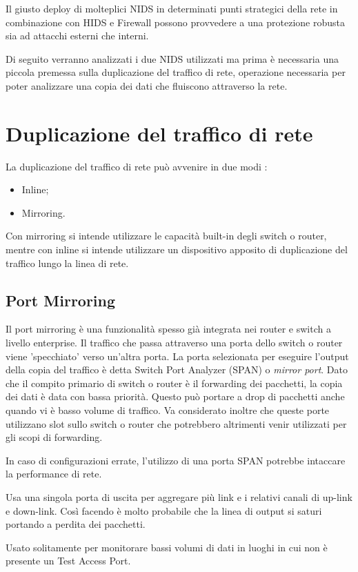 Il giusto deploy di molteplici NIDS in determinati punti strategici della rete in combinazione con HIDS e Firewall possono provvedere a una  protezione robusta sia ad attacchi esterni che interni.

Di seguito verranno analizzati i due NIDS utilizzati ma prima è necessaria una piccola premessa sulla duplicazione del traffico di rete, operazione necessaria per poter analizzare una copia dei dati che fluiscono attraverso la rete.
\section{Duplicazione del traffico di rete}
La duplicazione del traffico di rete può avvenire in due modi \cite{svoboda2015network}:
\begin{itemize}
    \item Inline;
    \item Mirroring.
\end{itemize}
Con mirroring si intende utilizzare le capacità built-in degli switch o router, mentre con inline si intende utilizzare un dispositivo apposito di duplicazione del traffico lungo la linea di rete.

\subsection{Port Mirroring}
Il port mirroring è una funzionalità spesso già integrata nei router e switch a livello enterprise. Il traffico che passa attraverso una porta dello switch o router viene 'specchiato' verso un'altra porta. La porta selezionata per eseguire l'output della copia del traffico è detta Switch Port Analyzer (SPAN) o \textit{mirror port}. Dato che il compito primario di switch o router è il forwarding dei pacchetti, la copia dei dati è data con bassa priorità. Questo può portare a drop di pacchetti anche quando vi è basso volume di traffico. 
Va considerato inoltre che queste porte utilizzano slot sullo switch o router che potrebbero altrimenti venir utilizzati per gli scopi di forwarding.

In caso di configurazioni errate, l'utilizzo di una porta SPAN potrebbe intaccare  la performance di rete.

Usa una singola porta di uscita per aggregare più link e i relativi canali di up-link e down-link. Così facendo è molto probabile che la linea di output si saturi portando a perdita dei pacchetti.

Usato solitamente per monitorare bassi volumi di dati in luoghi in cui non è presente un Test Access Port. 



